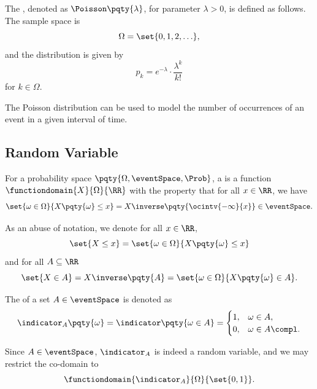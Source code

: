 \begin{definition}
    \label{def:poisson-distribution}%
    The , denoted as \(\Poisson\pqty{\lambda}\), for parameter \(\lambda > 0\), is defined as follows. The sample space is
    \[
        \Omega = \set{0, 1, 2, \ldots},
    \]
    and the distribution is given by
    \[
        p_k = e^{-\lambda} \cdot \frac{\lambda^k}{k!}
    \]
    for \(k \in \Omega\).
\end{definition}

The Poisson distribution can be used to model the number of occurrences of an event in a given interval of time.

\subsection{Random Variable}

\begin{definition}
    \label{def:random-variable}%
    For a probability space \(\pqty{\Omega, \eventSpace, \Prob}\), a  is a function \(\functiondomain{X}{\Omega}{\RR}\) with the property that for all \(x \in \RR\), we have
    \[
        \set{\omega \in \Omega}{X\pqty{\omega} \leq x} = X\inverse \pqty{\ocintv{-\infty}{x}} \in \eventSpace.
    \]
\end{definition}

\begin{notation}
    As an abuse of notation, we denote for all \(x \in \RR\),
    \[
        \set{X \leq x} = \set{\omega \in \Omega}{X\pqty{\omega} \leq x}
    \]
    and for all \(A \subseteq \RR\)
    \[
        \set{X \in A} = X\inverse\pqty{A} = \set{\omega \in \Omega}{X\pqty{\omega} \in A}.
    \]
\end{notation}

\begin{definition}
    \label{def:indicator-random-variable}%
    The  of a set \(A \in \eventSpace\) is denoted as
    \[
        \indicator_{A} \pqty{\omega} = \indicator\pqty{\omega \in A} = \begin{cases}
            1, & \omega \in A, \\ 0, & \omega \in A\compl.
        \end{cases}
    \]

    Since \(A \in \eventSpace\), \(\indicator_{A}\) is indeed a random variable, and we may restrict the co-domain to
    \[
        \functiondomain{\indicator_{A}}{\Omega}{\set{0, 1}}.
    \]
\end{definition}


